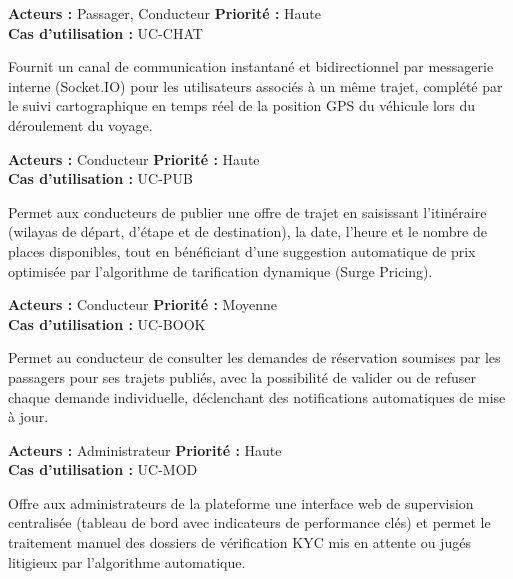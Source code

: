 \begin{funcreq}[title={\textbf{EF~1.5 — Messagerie temps réel et suivi GPS}}]
\textbf{Acteurs :} Passager, Conducteur \hfill \textbf{Priorité :} Haute \\
\textbf{Cas d'utilisation :} UC-CHAT
\smallskip

Fournit un canal de communication instantané et bidirectionnel par messagerie interne (Socket.IO) pour les utilisateurs associés à un même trajet, complété par le suivi cartographique en temps réel de la position GPS du véhicule lors du déroulement du voyage.
\end{funcreq}

\begin{funcreq}[title={\textbf{EF~2.1 — Publication d'un trajet avec tarif dynamique}}]
\textbf{Acteurs :} Conducteur \hfill \textbf{Priorité :} Haute \\
\textbf{Cas d'utilisation :} UC-PUB
\smallskip

Permet aux conducteurs de publier une offre de trajet en saisissant l'itinéraire (wilayas de départ, d'étape et de destination), la date, l'heure et le nombre de places disponibles, tout en bénéficiant d'une suggestion automatique de prix optimisée par l'algorithme de tarification dynamique (Surge Pricing).
\end{funcreq}

\begin{funcreq}[title={\textbf{EF~2.2 — Validation ou refus des réservations}}]
\textbf{Acteurs :} Conducteur \hfill \textbf{Priorité :} Moyenne \\
\textbf{Cas d'utilisation :} UC-BOOK
\smallskip

Permet au conducteur de consulter les demandes de réservation soumises par les passagers pour ses trajets publiés, avec la possibilité de valider ou de refuser chaque demande individuelle, déclenchant des notifications automatiques de mise à jour.
\end{funcreq}

\begin{funcreq}[title={\textbf{EF~3.1 — Tableau de bord, statistiques et gestion KYC manuel}}]
\textbf{Acteurs :} Administrateur \hfill \textbf{Priorité :} Haute \\
\textbf{Cas d'utilisation :} UC-MOD
\smallskip

Offre aux administrateurs de la plateforme une interface web de supervision centralisée (tableau de bord avec indicateurs de performance clés) et permet le traitement manuel des dossiers de vérification KYC mis en attente ou jugés litigieux par l'algorithme automatique.
\end{funcreq}


